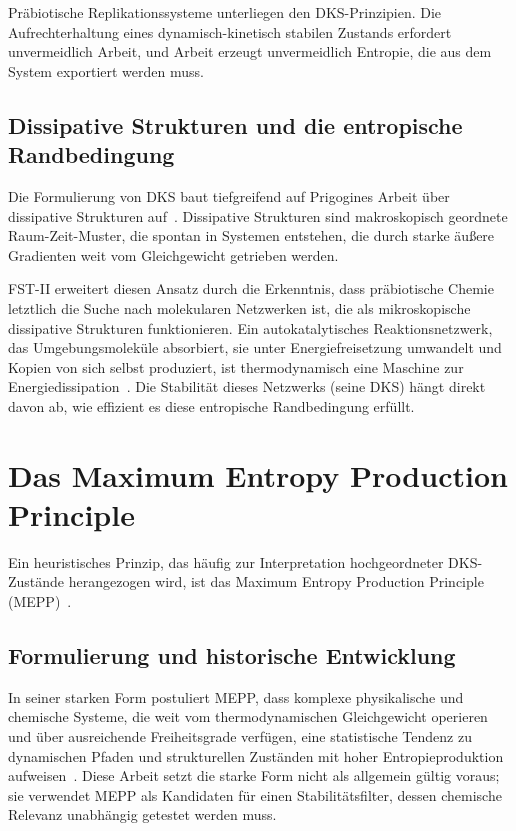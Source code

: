 \documentclass[12pt,a4paper]{article}
\theoremstyle{remark}
\begin{document}
Präbiotische Replikationssysteme unterliegen den DKS-Prinzipien. Die Aufrechterhaltung eines dynamisch-kinetisch stabilen Zustands erfordert unvermeidlich Arbeit, und Arbeit erzeugt unvermeidlich Entropie, die aus dem System exportiert werden muss.

\subsection{Dissipative Strukturen und die entropische Randbedingung}

Die Formulierung von DKS baut tiefgreifend auf Prigogines Arbeit über dissipative Strukturen auf~\citep{Bioenergetics}. Dissipative Strukturen sind makroskopisch geordnete Raum-Zeit-Muster, die spontan in Systemen entstehen, die durch starke äußere Gradienten weit vom Gleichgewicht getrieben werden.

FST-II erweitert diesen Ansatz durch die Erkenntnis, dass präbiotische Chemie letztlich die Suche nach molekularen Netzwerken ist, die als mikroskopische dissipative Strukturen funktionieren. Ein autokatalytisches Reaktionsnetzwerk, das Umgebungsmoleküle absorbiert, sie unter Energiefreisetzung umwandelt und Kopien von sich selbst produziert, ist thermodynamisch eine Maschine zur Energiedissipation~\citep{Bioenergetics}. Die Stabilität dieses Netzwerks (seine DKS) hängt direkt davon ab, wie effizient es diese entropische Randbedingung erfüllt.

\section{Das Maximum Entropy Production Principle}
\label{sec:mepp}

Ein heuristisches Prinzip, das häufig zur Interpretation hochgeordneter DKS-Zustände herangezogen wird, ist das Maximum Entropy Production Principle (MEPP)~\citep{EntropyMEPP,MEPP2006}.

\subsection{Formulierung und historische Entwicklung}

In seiner starken Form postuliert MEPP, dass komplexe physikalische und chemische Systeme, die weit vom thermodynamischen Gleichgewicht operieren und über ausreichende Freiheitsgrade verfügen, eine statistische Tendenz zu dynamischen Pfaden und strukturellen Zuständen mit hoher Entropieproduktion aufweisen~\citep{ThermodynamicsOrganisms}. Diese Arbeit setzt die starke Form nicht als allgemein gültig voraus; sie verwendet MEPP als Kandidaten für einen Stabilitätsfilter, dessen chemische Relevanz unabhängig getestet werden muss.
\end{document}
